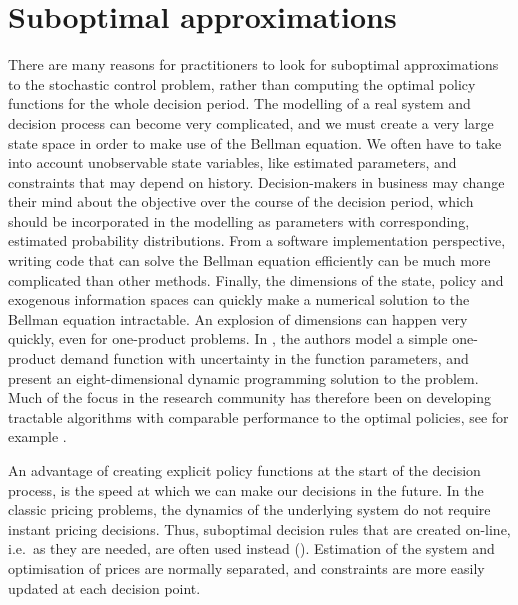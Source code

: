 \documentclass[main.tex]{subfiles}
\begin{document}
\listoftodos

\section{Suboptimal approximations}\label{sec:suboptimal_approximations}
There are many reasons for practitioners to look for suboptimal
approximations to the stochastic control problem, rather than
computing the optimal policy functions for the whole decision period.
The modelling of a real system and decision process can become very
complicated, and  we must  create a very
large state space in order to make use of the Bellman equation.
We often have to take into account unobservable
state variables, like estimated parameters, and constraints
that may
depend on history. Decision-makers in business may change their mind
about the objective over the course of the decision period, which should
be incorporated in the modelling as parameters with corresponding, estimated
probability distributions.
From a software implementation perspective, writing code that can
solve the Bellman equation efficiently can be much more complicated
than other methods.
Finally, the dimensions of the state, policy and exogenous
information spaces can quickly make a numerical solution to the Bellman
equation intractable. An explosion of dimensions can happen very
quickly, even for one-product problems. In
\citet{bertsimas2001dynamic}, the authors model a simple
one-product demand function with uncertainty in the function
parameters, and present an eight-dimensional dynamic programming
solution to the problem.
Much of the focus in the research community has therefore been on
developing tractable algorithms with comparable performance to the
optimal policies, see for example
\citet{powell2011approximate,bertsekas2012dynamic}.

An advantage of creating explicit policy functions at the start of the decision
process, is the speed at which we can make our decisions in the
future. In the classic pricing problems, the dynamics of the
underlying system do not require instant pricing decisions. Thus,
suboptimal decision rules that are created on-line, i.e.~as they are needed, are often used
instead (\citet{talluri2006theory}). Estimation of the system and optimisation of prices are
normally separated, and constraints are more easily updated at each
decision point.
\end{document}
